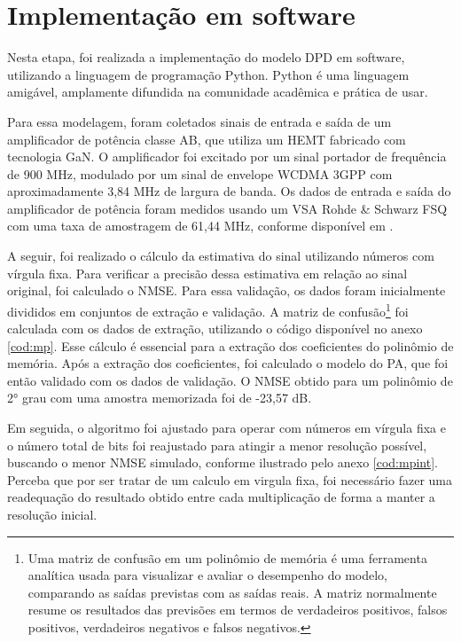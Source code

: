 \section{Implementação em software}

Nesta etapa, foi realizada a implementação do modelo DPD em software, utilizando a linguagem de programação Python. Python é uma linguagem amigável, amplamente difundida na comunidade acadêmica e prática de usar.

Para essa modelagem, foram coletados sinais de entrada e saída de um amplificador de potência classe AB, que utiliza um HEMT fabricado com tecnologia GaN. O amplificador foi excitado por um sinal portador de frequência de 900 MHz, modulado por um sinal de envelope WCDMA 3GPP com aproximadamente 3,84 MHz de largura de banda. Os dados de entrada e saída do amplificador de potência foram medidos usando um VSA Rohde \& Schwarz FSQ com uma taxa de amostragem de 61,44 MHz, conforme disponível em \cite{Bonfim2016}.

A seguir, foi realizado o cálculo da estimativa do sinal utilizando números com vírgula fixa. Para verificar a precisão dessa estimativa em relação ao sinal original, foi calculado o NMSE. Para essa validação, os dados foram inicialmente divididos em conjuntos de extração e validação. A matriz de confusão\footnote{Uma matriz de confusão em um polinômio de memória é uma ferramenta analítica usada para visualizar e avaliar o desempenho do modelo, comparando as saídas previstas com as saídas reais. A matriz normalmente resume os resultados das previsões em termos de verdadeiros positivos, falsos positivos, verdadeiros negativos e falsos negativos.} foi calculada com os dados de extração, utilizando o código disponível no anexo \ref{cod:mp}. Esse cálculo é essencial para a extração dos coeficientes do polinômio de memória. Após a extração dos coeficientes, foi calculado o modelo do PA, que foi então validado com os dados de validação. O NMSE obtido para um polinômio de 2° grau com uma amostra memorizada foi de -23,57 dB.

Em seguida, o algoritmo foi ajustado para operar com números em vírgula fixa e o número total de bits foi reajustado para atingir a menor resolução possível, buscando o menor NMSE simulado, conforme ilustrado pelo anexo \ref{cod:mpint}. Perceba que por ser tratar de um calculo em virgula fixa, foi necessário fazer uma readequação do resultado obtido entre cada multiplicação de forma a manter a resolução inicial.

